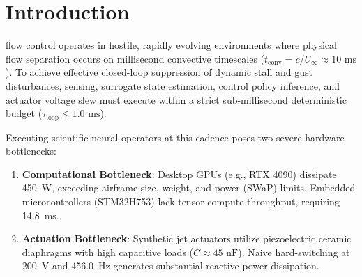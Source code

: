 \documentclass[journal,10pt,twocolumn]{IEEEtran}
\begin{document}
\section{Introduction}
 flow control operates in hostile, rapidly evolving environments where physical flow separation occurs on millisecond convective timescales ($t_{\text{conv}} = c / U_\infty \approx 10\text{ ms}$). To achieve effective closed-loop suppression of dynamic stall and gust disturbances, sensing, surrogate state estimation, control policy inference, and actuator voltage slew must execute within a strict sub-millisecond deterministic budget ($\tau_{\text{loop}} \le 1.0\text{ ms}$).

Executing scientific neural operators at this cadence poses two severe hardware bottlenecks:
\begin{enumerate}
    \item \textbf{Computational Bottleneck}: Desktop GPUs (e.g., RTX 4090) dissipate 450~W, exceeding airframe size, weight, and power (SWaP) limits. Embedded microcontrollers (STM32H753) lack tensor compute throughput, requiring 14.8~ms.
    \item \textbf{Actuation Bottleneck}: Synthetic jet actuators utilize piezoelectric ceramic diaphragms with high capacitive loads ($C \approx 45\text{ nF}$). Naive hard-switching at 200~V and 456.0~Hz generates substantial reactive power dissipation.
\end{enumerate}

\begin{table}[h]
\caption{Edge Inference Profiling and Energy Consumption Across Hardware Platforms}
\label{tab:hardware_comp}
\centering
\footnotesize
{}
\end{table}
\end{document}
